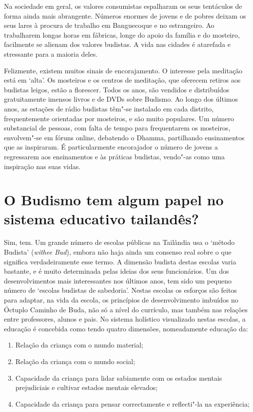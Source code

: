 Na sociedade em geral, os valores consumistas espalharam os seus
tentáculos de forma ainda mais abrangente. Números enormes de jovens e
de pobres deixam os seus lares à procura de trabalho em Banguecoque e no
estrangeiro. Ao trabalharem longas horas em fábricas, longe do apoio da
família e do mosteiro, facilmente se alienam dos valores budistas. A
vida nas cidades é atarefada e stressante para a maioria deles.

Felizmente, existem muitos sinais de encorajamento. O interesse pela
meditação está em `alta'. Os mosteiros e os centros de meditação, que
oferecem retiros aos budistas leigos, estão a florescer. Todos os anos,
são vendidos e distribuídos gratuitamente imensos livros e de DVDs sobre
Budismo. Ao longo dos últimos anos, as estações de rádio budistas têm"-se
instalado em cada distrito, frequentemente orientadas por mosteiros, e
são muito populares. Um número substancial de pessoas, com falta de
tempo para frequentarem os mosteiros, envolvem"-se em fóruns online,
debatendo o Dhamma, partilhando ensinamentos que as inspiraram. É
particularmente encorajador o número de jovens a regressarem aos
ensinamentos e às práticas budistas, vendo"-as como uma inspiração nas
suas vidas.

\section{O Budismo tem algum papel no sistema educativo tailandês?}

Sim, tem. Um grande número de escolas públicas na Tailândia usa o
`método Budista' (\emph{withee Bud}), embora não haja ainda um
consenso real sobre o que significa verdadeiramente esse termo. A
dimensão budista destas escolas varia bastante, e é muito determinada
pelas ideias dos seus funcionários. Um dos desenvolvimentos mais
interessantes nos últimos anos, tem sido um pequeno número de `escolas
budistas de sabedoria'. Nestas escolas os esforços são feitos para
adaptar, na vida da escola, os princípios de desenvolvimento imbuídos no
Óctuplo Caminho de Buda, não só a nível do currículo, mas também nas
relações entre professores, alunos e pais. No sistema holístico
visualizado nestas escolas, a educação é concebida como tendo quatro
dimensões, nomeadamente educação da:

\begin{enumerate}
\item Relação da criança com o mundo material;
\item Relação da criança com o mundo social;
\item Capacidade da criança para lidar sabiamente com os estados mentais
  prejudiciais e cultivar estados mentais elevados;
\item Capacidade da criança para pensar correctamente e reflecti"-la na
  experiência;
\end{enumerate}

